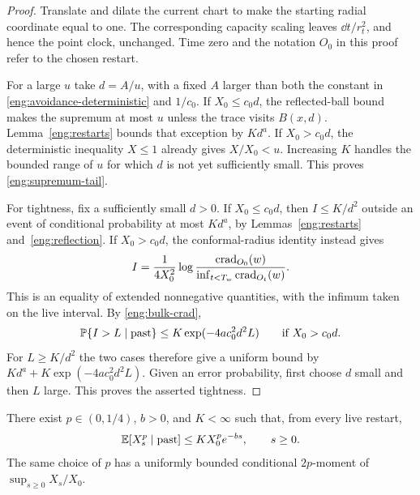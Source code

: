 \begin{proof}
Translate and dilate the current chart to make the starting radial
coordinate equal to one.  The corresponding capacity scaling leaves
$\dd t/r_t^2$, and hence the point clock, unchanged.
Time zero and the notation $O_0$ in this proof refer to the chosen
restart.

For a large $u$ take $d=A/u$, with a fixed $A$ larger than both the
constant in \eqref{eng:avoidance-deterministic} and $1/c_0$.  If
$X_0\le c_0d$, the reflected-ball bound makes the supremum at most $u$
unless the trace visits $B(x,d)$.  Lemma~\ref{eng:restarts} bounds that
exception by $Kd^a$.  If $X_0>c_0d$, the deterministic inequality $X\le1$
already gives $X/X_0<u$.  Increasing $K$ handles the bounded range of
$u$ for which $d$ is not yet sufficiently small.  This proves
\eqref{eng:supremum-tail}.

For tightness, fix a sufficiently small $d>0$.  If $X_0\le c_0d$, then
$I\le K/d^2$ outside an event of conditional probability at most $Kd^a$,
by Lemmas~\ref{eng:restarts} and~\ref{eng:reflection}.  If
$X_0>c_0d$, the conformal-radius identity instead gives
\[
 I=\frac1{4X_0^2}
    \log\frac{\operatorname{crad}_{O_0}(w)}
                  {\inf_{t<T_w}\operatorname{crad}_{O_t}(w)}.
\]
This is an equality of extended nonnegative quantities, with the
infimum taken on the live interval.  By \eqref{eng:bulk-crad},
\[
 \mathbb P\{I>L\mid\text{past}\}
 \le K\exp(-4a c_0^2d^2L)
 \qquad\text{if }X_0>c_0d.
\]
For $L\ge K/d^2$ the two cases therefore give a uniform bound by
$Kd^a+K\exp(-4a c_0^2d^2L)$.  Given an error probability, first choose
$d$ small and then $L$ large.  This proves the asserted tightness.
\end{proof}

\begin{lemma}\label{eng:decay}
There exist $p\in(0,1/4)$, $b>0$, and $K<\infty$ such that, from every
live restart,
\begin{equation}\label{eng:moment-decay}
 \mathbb E[X_s^p\mid\text{past}]\le K X_0^p e^{-bs},\qquad s\ge0.
\end{equation}
The same choice of $p$ has a uniformly bounded conditional $2p$-moment
of $\sup_{s\ge0}X_s/X_0$.
\end{lemma}

